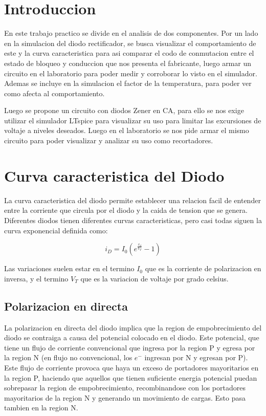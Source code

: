 \documentclass[chaptersright]{informeutn}
\begin{document}
  \maketitle

  \tableofcontents
  \setcounter{page}{1}
  \thispagestyle{plain}

  \chapter{Introduccion}
    En este trabajo practico se divide en el analisis de dos componentes. Por un lado en la simulacion del diodo
    rectificador, se busca visualizar el comportamiento de este y la curva caracteristica para asi comparar el codo de
    conmutacion entre el estado de bloqueo y conduccion que nos presenta el fabricante, luego armar un circuito en el
    laboratorio para poder medir y corroborar lo visto en el simulador. Ademas se incluye en la simulacion el factor de
    la temperatura, para poder ver como afecta al comportamiento.

    Luego se propone un circuito con diodos Zener en CA, para ello se nos exige utilizar el simulador LTspice para
    visualizar su uso para limitar las excursiones de voltaje a niveles deseados. Luego en el laboratorio se nos pide
    armar el mismo circuito para poder visualizar y analizar su uso como recortadores.

  \chapter{Curva caracteristica del Diodo}
    La curva caracteristica del diodo permite establecer una relacion facil de entender entre la corriente que circula
    por el diodo y la caida de tension que se genera. Diferentes diodos tienen diferentes curvas caracteristicas, pero
    casi todas siguen la curva exponencial definida como:

    \begin{equation}
      i_D = I_0 \left(e^{\frac{v_d}{V_T}} - 1 \right)
      \label{eq.caracteristica}
    \end{equation}

    Las variaciones suelen estar en el termino $I_0$ que es la corriente de polarizacion en inversa, y el termino $V_T$
    que es la variacion de voltaje por grado celsius.

    \section{Polarizacion en directa}
      La polarizacion en directa del diodo implica que la region de empobrecimiento del diodo se contraiga a causa del
      potencial colocado en el diodo. Este potencial, que tiene un flujo de corriente convencional que ingresa por la
      region P y egresa por la region N (en flujo no convencional, los $e^-$ ingresan por N y egresan por P). Este
      flujo de corriente provoca que haya un exceso de portadores mayoritarios en la region P, haciendo que aquellos
      que tienen suficiente energia potencial puedan sobrepasar la region de empobrecimiento, recombinandose con los
      portadores mayoritarios de la region N y generando un movimiento de cargas. Esto pasa tambien en la region N.
\end{document}
